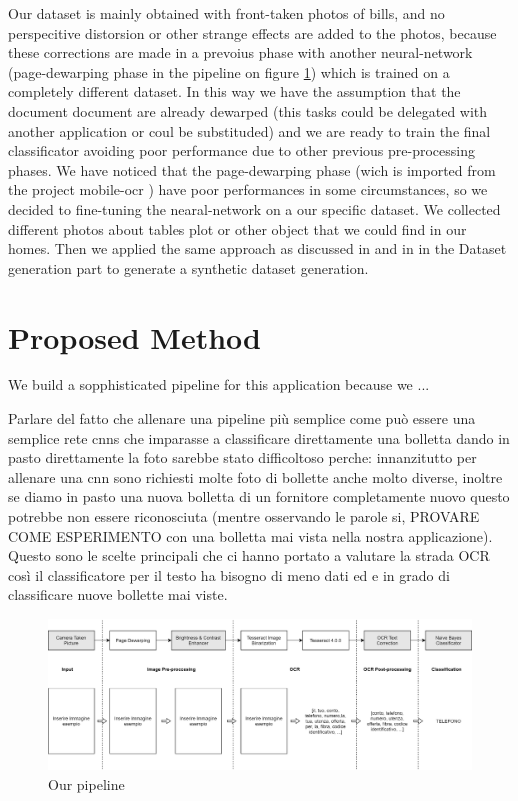 \documentclass[10pt,twocolumn,letterpaper]{article}
\begin{document}
Our dataset is mainly obtained with front-taken photos of bills, and no perspecitive distorsion or other strange effects are added to the photos, because these corrections are made in a prevoius phase with another neural-network (page-dewarping phase in the pipeline on figure \ref{pipeline}) which is trained on a completely different dataset. In this way we have the assumption that the document document are already dewarped (this tasks could be delegated with another application or coul be substituded) and we are ready to train the final classificator avoiding poor performance due to other previous pre-processing phases. We have noticed that the page-dewarping phase (wich is imported from the project mobile-ocr \cite{mobile-ocr}) have poor performances in some circumstances, so we decided to fine-tuning the nearal-network on a our specific dataset. We collected different photos about tables plot or other object that we could find in our homes. Then we applied the same approach as discussed in \cite{Improvingcamera-based} and in \cite{recoveringhomography} in the Dataset generation part to generate a synthetic dataset generation.


\section{Proposed Method}

We build a sopphisticated pipeline for this application because we ...

Parlare del fatto che allenare una pipeline più semplice come può essere una semplice rete cnns che imparasse a classificare direttamente una bolletta dando in pasto direttamente la foto sarebbe stato difficoltoso perche: innanzitutto per allenare una cnn sono richiesti molte foto di bollette anche molto diverse, inoltre se diamo in pasto una nuova bolletta di un fornitore completamente nuovo questo potrebbe non essere riconosciuta (mentre osservando le parole si, PROVARE COME ESPERIMENTO con una bolletta mai vista nella nostra applicazione). Questo sono le scelte principali che ci hanno portato a valutare la strada OCR così il classificatore per il testo ha bisogno di meno dati ed e in grado di classificare nuove bollette mai viste.



\begin{figure}[h]
	\centering
	\includegraphics[width=1.0\textwidth]{images/pipeline.png}
	\caption{Our pipeline}
	\label{pipeline}
\end{figure}
\end{document}
